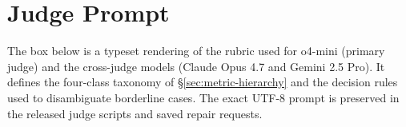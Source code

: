 \documentclass{article}
\begin{document}
\section{Judge Prompt}
\label{app:judge-prompt}

The box below is a typeset rendering of the rubric used for o4-mini (primary judge) and the cross-judge models (Claude Opus 4.7 and Gemini 2.5 Pro). It defines the four-class taxonomy of \S\ref{sec:metric-hierarchy} and the decision rules used to disambiguate borderline cases. The exact UTF-8 prompt is preserved in the released judge scripts and saved repair requests.
\end{document}
